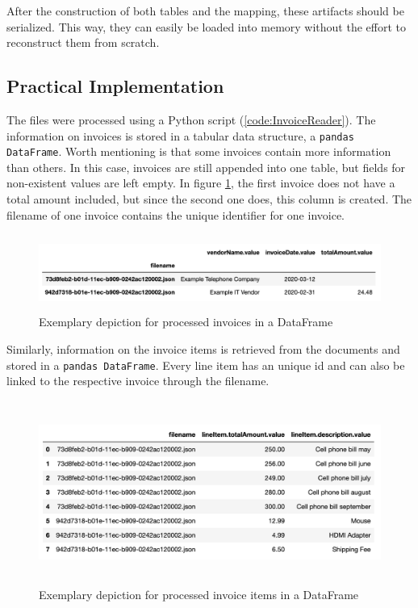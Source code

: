 	After the construction of both tables and the mapping, these artifacts should be serialized. This way, they can easily be loaded into memory without the effort to reconstruct them from scratch.
	
    \subsection{Practical Implementation}
	
	The files were processed using a Python script (\ref{code:InvoiceReader}). The information on invoices is stored in a tabular data structure, a \lstinline|pandas DataFrame|. Worth mentioning is that some invoices contain more information than others. In this case, invoices are still appended into one table, but fields for non-existent values are left empty. In figure \ref{fig:df-invoices}, the first invoice does not have a total amount included, but since the second one does, this column is created.
	The filename of one invoice contains the unique identifier for one invoice.
	
	\begin{figure}[ht]
		\centering
		\includegraphics[height=2.5cm]{Bilder/practical/df_invoices.png}
		\caption{Exemplary depiction for processed invoices in a DataFrame}
		\label{fig:df-invoices}
	\end{figure}

	Similarly, information on the invoice items is retrieved from the documents and stored in a \lstinline|pandas DataFrame|. Every line item has an unique id and can also be linked to the respective invoice through the filename.
	
	\begin{figure}[ht]
		\centering
		\includegraphics[height=6cm]{Bilder/practical/df_lineitems.png}
		\caption{Exemplary depiction for processed invoice items in a DataFrame}
		\label{fig:df-invoice}
	\end{figure}
	
